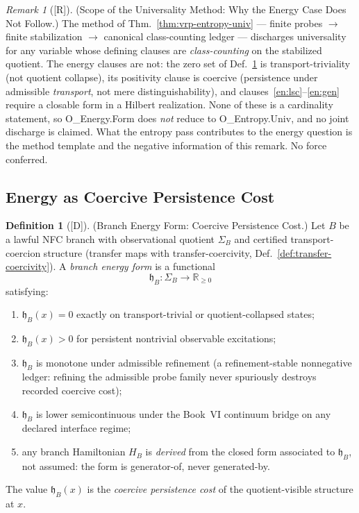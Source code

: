 \documentclass[12pt,oneside]{amsbook}
\theoremstyle{plain}
\theoremstyle{definition}
\newtheorem{definition}[theorem]{Definition}
\theoremstyle{remark}
\newtheorem{remark}[theorem]{Remark}
\newcommand{\status}[1]{\textup{[#1]}}
\begin{document}
\begin{remark}[\status{R}]\label{rmk:vrp-univ-method-scope}
\textup{(Scope of the Universality Method: Why the Energy Case
Does Not Follow.)}
The method of Thm.~\ref{thm:vrp-entropy-univ} --- finite probes
$\to$ finite stabilization $\to$ canonical class-counting ledger
--- discharges universality for any variable whose defining
clauses are \emph{class-counting} on the stabilized quotient.  The
energy clauses are not: the zero set of
Def.~\ref{def:branch-energy-form} is transport-triviality (not
quotient collapse), its positivity clause is coercive (persistence
under admissible \emph{transport}, not mere distinguishability),
and clauses~\ref{en:lsc}--\ref{en:gen} require a closable form in
a Hilbert realization.  None of these is a cardinality statement,
so O\_Energy.Form does \emph{not} reduce to O\_Entropy.Univ, and
no joint discharge is claimed.  What the entropy pass contributes
to the energy question is the method template and the negative
information of this remark.  No force conferred.
\end{remark}

\subsection{Energy as Coercive Persistence Cost}

\begin{definition}[\status{D}]\label{def:branch-energy-form}
\textup{(Branch Energy Form: Coercive Persistence Cost.)}
Let $B$ be a lawful NFC branch with observational quotient
$\Sigma_B$ and certified transport-coercion structure (transfer
maps with transfer-coercivity,
Def.~\ref{def:transfer-coercivity}).  A \emph{branch energy form}
is a functional
\[
  \mathfrak{h}_B : \Sigma_B \longrightarrow \mathbb{R}_{\ge 0}
\]
satisfying:
\begin{enumerate}[label=\textup{(E\arabic*)}]
  \item\label{en:zero} $\mathfrak{h}_B(x) = 0$ exactly on
    transport-trivial or quotient-collapsed states;
  \item\label{en:pos} $\mathfrak{h}_B(x) > 0$ for persistent
    nontrivial observable excitations;
  \item\label{en:refine} $\mathfrak{h}_B$ is monotone under
    admissible refinement (a refinement-stable nonnegative ledger:
    refining the admissible probe family never spuriously destroys
    recorded coercive cost);
  \item\label{en:lsc} $\mathfrak{h}_B$ is lower semicontinuous
    under the Book~VI continuum bridge on any declared interface
    regime;
  \item\label{en:gen} any branch Hamiltonian $H_B$ is
    \emph{derived} from the closed form associated to
    $\mathfrak{h}_B$, not assumed: the form is generator-of, never
    generated-by.
\end{enumerate}
The value $\mathfrak{h}_B(x)$ is the \emph{coercive persistence
cost} of the quotient-visible structure at $x$.
\end{definition}
\end{document}

